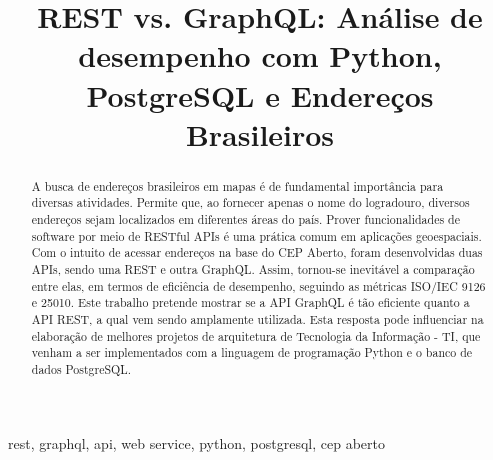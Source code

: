 \documentclass[conference]{IEEEtran}
\begin{document}
\title{REST vs. GraphQL: Análise de desempenho com Python, PostgreSQL e Endereços Brasileiros\\
}

\author{
\and
{}
\and
{}
}

\maketitle

\begin{abstract}
A busca de endereços brasileiros em mapas é de fundamental importância para diversas atividades. Permite que, ao fornecer apenas o nome do logradouro, diversos endereços sejam localizados em diferentes áreas do país. Prover funcionalidades de software por meio de RESTful APIs é uma prática comum em aplicações geoespaciais. Com o intuito de acessar endereços na base do CEP Aberto, foram desenvolvidas duas APIs, sendo uma REST e outra GraphQL. Assim, tornou-se inevitável a comparação entre elas, em termos de eficiência de desempenho, seguindo as métricas ISO/IEC 9126 e 25010. Este trabalho pretende mostrar se a API GraphQL é tão eficiente quanto a API REST, a qual vem sendo amplamente utilizada. Esta resposta pode influenciar na elaboração de melhores projetos de arquitetura de Tecnologia da Informação - TI, que venham a ser implementados com a linguagem de programação Python e o banco de dados PostgreSQL.
\end{abstract}

\begin{IEEEkeywords}
rest, graphql, api, web service, python, postgresql, cep aberto
\end{IEEEkeywords}
\end{document}
